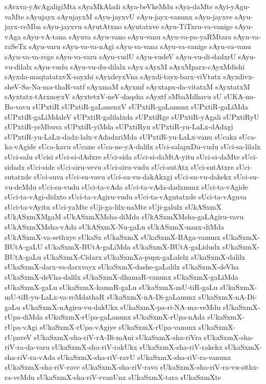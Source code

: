 {sAvxva-yAvAgaligiMta
sAyaMkAladi
sAya-beVkeMdu
sAya-daMte
sAyi-yAgu-vaMte
sAyujayx
sAyujayxM
sAyu-jayxvU
sAyu-jayx-vanunx
sAyu-jayxve
sAyu-jayx-veMba
sAyu-jayxvu
sAyutAtxno
sAyutatxve
sAyu-TiTxru-va-vanige
sAyu-vAga
sAyu-vA-tana
sAyuva
sAyu-vano
sAyu-vanu
sAyu-va-pa-yaRMtara
sAyu-va-raSeTx
sAyu-varu
sAyu-va-va-nAgi
sAyu-va-vana
sAyu-va-vanige
sAyu-va-vanu
sAyu-va-va-rege
sAyu-va-varu
sAyu-vudU
sAyu-vudeV
sAyu-vu-di-dadxrU
sAyu-vu-dilalx
sAyu-vudu
sAyu-vu-du-dilalx
sAyx
sAyxM
sAyxMparx-cAyxMdishi
sAyxda-maqtatatxvX-sayxhi
sAyxdeyxVna
sAyxdi-tayx-barx-viVtutx
sAyxdivx-sheV-Sa-Na-ma-thaR-vatf
sAyxmaM
sAyxmf
sAyxtapx-da-vitatxM
sAyxtatxM
sAyxtatx-tArxnoyxV
sAyxtetxV-neV-daqsha
sAyxtf
sMbaMdhavu
sU
sUKA-nu-Ba-vavu
sUPxtiR
sUPxtiR-gaLanenxV
sUPxtiR-gaLanunx
sUPxtiR-gaLiMda
sUPxtiR-gaLiMdaleV
sUPxtiR-galilalxda
sUPxtiRge
sUPxtiR-yAgali
sUPxtiRyU
sUPxtiR-yeMbuva
sUPxtiR-yiMda
sUPxtiRyu
sUPxtiR-yu-LaLx-dAdxgi
sUPxtiR-yu-LaLx-dadx-lalx-vAdadxriMda
sUPxtiR-yu-LaLx-vanu
sUcaka
sUca-ka-vAgide
sUca-kavu
sUcane
sUca-ne-yA-dalilx
sUci-salapxDu-vudu
sUci-sa-lilalx
sUci-salu
sUcisi
sUci-si-dAdxre
sUci-sida
sUci-si-daMtA-yitu
sUci-si-daMte
sUci-sidadx
sUci-side
sUci-siru-vevu
sUci-siru-vudu
sUci-sutAtx
sUci-sutAtxre
sUci-sutatxde
sUci-suva
sUci-su-vavu
sUci-su-vu-dakAkxgi
sUci-su-vu-dakekx
sUci-su-vu-deMdu
sUci-su-vudu
sUci-ta-vAda
sUci-ta-vAda-dadxnunx
sUci-ta-vAgide
sUci-ta-vAgi-didxto
sUci-ta-vAgiru-vudu
sUci-ta-vAgutatxde
sUci-ta-vAguva
sUci-ta-vAyitu
sUci-yaMte
sUji-ga-lilx-naMte
sUji-galulx
sUkASxmX
sUkASxmXMgaM
sUkASxmXMsha-diMda
sUkASxmXMsha-gaLAgiru-vavu
sUkASxmXMsha-vAda
sUkASxmX-Nu-gaLu
sUkASxmX-nanx-diMda
sUkASxmX-va-sethxye
sUkaSx
sUkaSxmX
sUkaSxmX-BAga-vanunx
sUkaSxmX-BUtA-gaLU
sUkaSxmX-BUtA-gaLiMda
sUkaSxmX-BUtA-gaLidudx
sUkaSxmX-BUtA-gaLu
sUkaSxmX-Cidarx
sUkaSxmXa-pupx-gaLalelx
sUkaSxmX-dalilx
sUkaSxmX-darx-va-darxvayx
sUkaSxmX-dashe-gaLalilx
sUkaSxmX-deVha
sUkaSxmX-deVha-dalilx
sUkaSxmX-dhamaR-vanunx
sUkaSxmX-gaLiMda
sUkaSxmX-gaLu
sUkaSxmX-kamaR-gaLu
sUkaSxmX-mU-tiR-gaLu
sUkaSxmX-mU-tiR-yu-LaLx-va-reMdathaR
sUkaSxmX-nA-Di-gaLanunx
sUkaSxmX-nA-Di-gaLu
sUkaSxmX-nAgiru-vu-dakUkx
sUkaSxmX-pa-ri-NA-ma-veMdu
sUkaSxmX-rUpa-diMda
sUkaSxmX-rUpa-gaLanunx
sUkaSxmX-rUpa-nAda
sUkaSxmX-rUpa-vAgi
sUkaSxmX-rUpa-vAgiye
sUkaSxmX-rUpa-vanunx
sUkaSxmX-rUpaveV
sUkaSxmX-sha-riV-rA-Bi-mAni
sUkaSxmX-sha-riVra
sUkaSxmX-sha-riV-ra-da-varu
sUkaSxmX-sha-riV-rakUkx
sUkaSxmX-sha-riV-rakekx
sUkaSxmX-sha-riV-ra-vAda
sUkaSxmX-sha-riV-ravU
sUkaSxmX-sha-riV-ra-vanunx
sUkaSxmX-sha-riV-rave
sUkaSxmX-sha-riV-ravo
sUkaSxmX-sha-riV-ra-vu-sithx-ra-veMdu
sUkaSxmX-sha-riV-rvanUnx
sUkaSxmX-tara
sUkaSxmXte
}

